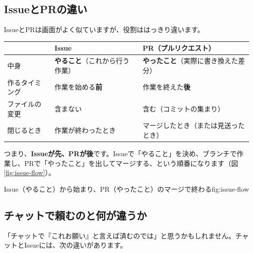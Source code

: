 \subsection{IssueとPRの違い}

IssueとPRは画面がよく似ていますが、役割ははっきり違います。

\begin{center}
\begin{tabularx}{\linewidth}{@{}>{\raggedright\arraybackslash}p{2.4cm} X X@{}}
\toprule
 & Issue & PR（プルリクエスト） \\
\midrule
中身 & \textbf{やること}（これから行う作業） & \textbf{やったこと}（実際に書き換えた差分） \\
作るタイミング & 作業を始める\textbf{前} & 作業を終えた\textbf{後} \\
ファイルの変更 & 含まない & 含む（コミットの集まり） \\
閉じるとき & 作業が終わったとき & マージしたとき（または見送ったとき） \\
\bottomrule
\end{tabularx}
\end{center}

つまり、\textbf{Issueが先、PRが後}です。Issueで「やること」を決め、ブランチで作業し、PRで「やったこと」を出してマージする、という順番になります（図\ref{fig:issue-flow}）。

\begin{numfig}{Issue（やること）から始まり、PR（やったこと）のマージで終わる}{fig:issue-flow}
\end{numfig}

\subsection{チャットで頼むのと何が違うか}

「チャットで『これお願い』と言えば済むのでは」と思うかもしれません。チャットとIssueには、次の違いがあります。

